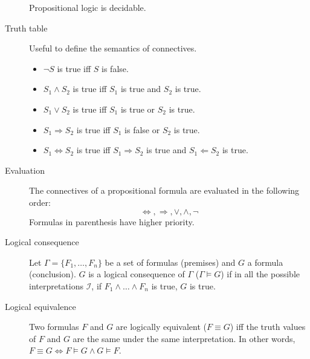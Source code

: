 \begin{description}
        Propositional logic is decidable.

    \item[Truth table] 
        Useful to define the semantics of connectives.
        \begin{itemize}
            \item $\lnot S$ is true iff $S$ is false.
            \item $S_1 \land S_2$ is true iff $S_1$ is true and $S_2$ is true.
            \item $S_1 \vee S_2$ is true iff $S_1$ is true or $S_2$ is true.
            \item $S_1 \Rightarrow S_2$ is true iff $S_1$ is false or $S_2$ is true.
            \item $S_1 \Leftrightarrow S_2$ is true iff $S_1 \Rightarrow S_2$ is true and $S_1 \Leftarrow S_2$ is true.
        \end{itemize}


    \item[Evaluation] 
        The connectives of a propositional formula are evaluated in the following order:
        \[ \Leftrightarrow, \Rightarrow, \vee, \land, \lnot \]
        Formulas in parenthesis have higher priority.

   \item[Logical consequence]  
        Let $\Gamma = \{F_1, \dots, F_n\}$ be a set of formulas (premises) and $G$ a formula (conclusion).
        $G$ is a logical consequence of $\Gamma$ ($\Gamma \models G$)
        if in all the possible interpretations $\mathcal{I}$, 
        if $F_1 \land \dots \land F_n$ is true, $G$ is true.

   \item[Logical equivalence] 
       Two formulas $F$ and $G$ are logically equivalent ($F \equiv G$) iff the truth values of $F$ and $G$
       are the same under the same interpretation.
       In other words, $F \equiv G \iff F \models G \land G \models F$.


\end{description}
